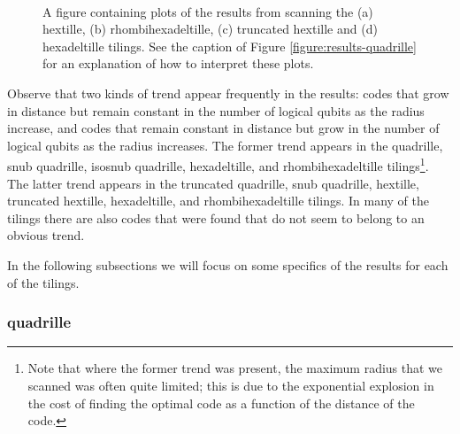 \documentclass[twocolumn,showpacs,preprintnumbers,amsmath,amssymb,nofootinbib,pra,floatfix]{revtex4-1}
\begin{document}
\begin{figure}
\hspace{1.67in}
 \\
\caption{
\label{figure:results-hextille}
A figure containing plots of the results from scanning the (a) hextille, (b) rhombihexadeltille, (c) truncated hextille and (d) hexadeltille tilings.  See the caption of Figure \ref{figure:results-quadrille} for an explanation of how to interpret these plots.
}
\end{figure}

Observe that two kinds of trend appear frequently in the results:  codes that grow in distance but remain constant in the number of logical qubits as the radius increase, and codes that remain constant in distance but grow in the number of logical qubits as the radius increases.  The former trend appears in the quadrille, snub quadrille, isosnub quadrille, hexadeltille, and rhombihexadeltille tilings\footnote{Note that where the former trend was present, the maximum radius that we scanned was often quite limited;  this is due to the exponential explosion in the cost of finding the optimal code as a function of the distance of the code.}.  The latter trend appears in the truncated quadrille, snub quadrille, hextille, truncated hextille, hexadeltille, and rhombihexadeltille tilings.  In many of the tilings there are also codes that were found that do not seem to belong to an obvious trend.

In the following subsections we will focus on some specifics of the results for each of the tilings.

\subsubsection{quadrille}
\end{document}
